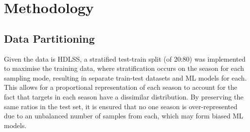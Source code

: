 \documentclass[conference]{IEEEtran}
\begin{document}
\section{Methodology}

\subsection{Data Partitioning}\label{DP}
Given the data is HDLSS, a stratified test-train split (of 20:80) was implemented to maximise the training data, where stratification occurs on the season for each sampling mode, resulting in separate train-test datasets and ML models for each. This allows for a proportional representation of each season to account for the fact that targets in each season have a dissimilar distribution. By preserving the same ratios in the test set, it is ensured that no one season is over-represented due to an unbalanced number of samples from each, which may form biased ML models.
\end{document}
